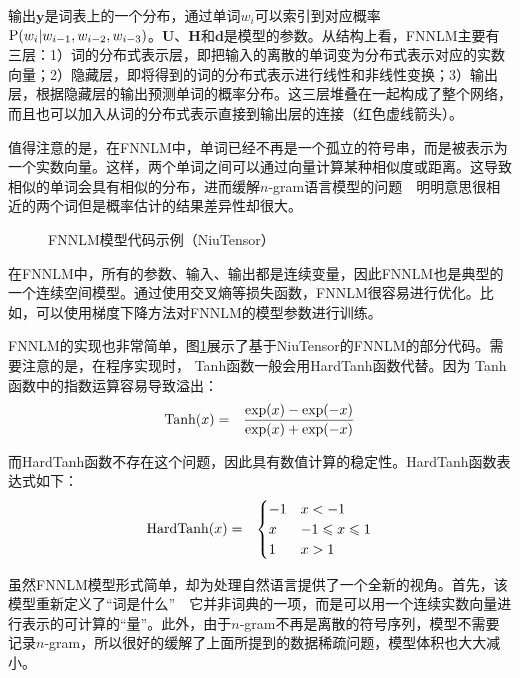 \parinterval  输出$ \mathbf y $是词表上的一个分布，通过单词$ w_i $可以索引到对应概率$ {\rm P}(w_i|w_{i-1},w_{i-2},\\w_{i-3}) $。$ \mathbf U $、$ \mathbf H $和$ \mathbf d $是模型的参数。从结构上看，FNNLM主要有三层：1）词的分布式表示层，即把输入的离散的单词变为分布式表示对应的实数向量；2）隐藏层，即将得到的词的分布式表示进行线性和非线性变换；3）输出层，根据隐藏层的输出预测单词的概率分布。这三层堆叠在一起构成了整个网络，而且也可以加入从词的分布式表示直接到输出层的连接（红色虚线箭头）。

\parinterval  值得注意的是，在FNNLM中，单词已经不再是一个孤立的符号串，而是被表示为一个实数向量。这样，两个单词之间可以通过向量计算某种相似度或距离。这导致相似的单词会具有相似的分布，进而缓解$n$-gram语言模型的问题\ \dash \ 明明意思很相近的两个词但是概率估计的结果差异性却很大。

\begin{figure}[htp]
\centering

\caption{FNNLM模型代码示例（NiuTensor）}
\label{fig:5-61}
\end{figure}

\parinterval  在FNNLM中，所有的参数、输入、输出都是连续变量，因此FNNLM也是典型的一个连续空间模型。通过使用交叉熵等损失函数，FNNLM很容易进行优化。比如，可以使用梯度下降方法对FNNLM的模型参数进行训练。

\parinterval  FNNLM的实现也非常简单，图\ref{fig:5-61}展示了基于NiuTensor的FNNLM的部分代码。需要注意的是，在程序实现时， Tanh函数一般会用HardTanh函数代替。因为 Tanh函数中的指数运算容易导致溢出：
\begin{eqnarray}
{\rm{Tanh}}(x)&=&\frac{{\rm{exp}}(x)-{\rm{exp}}(-x)}{{\rm{exp}}(x)+{\rm{exp}}(-x)}
\label{}
\end{eqnarray}

\noindent 而HardTanh函数不存在这个问题，因此具有数值计算的稳定性。HardTanh函数表达式如下：
\begin{eqnarray}
{\rm{HardTanh}}(x)&=&\begin{cases} -1 & x<-1\\x & -1\leqslant x\leqslant 1\\1 & x>1\end{cases}
\label{}
\end{eqnarray}

\parinterval  虽然FNNLM模型形式简单，却为处理自然语言提供了一个全新的视角。首先，该模型重新定义了``词是什么''\ \dash \ 它并非词典的一项，而是可以用一个连续实数向量进行表示的可计算的``量''。此外，由于$n$-gram不再是离散的符号序列，模型不需要记录$n$-gram，所以很好的缓解了上面所提到的数据稀疏问题，模型体积也大大减小。

